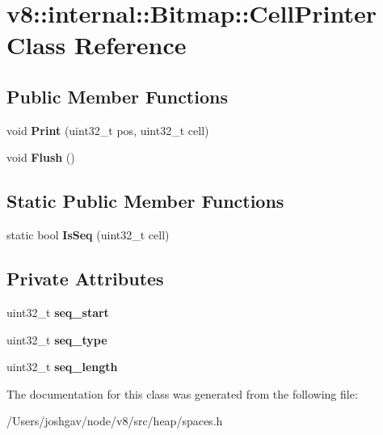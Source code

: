 \hypertarget{classv8_1_1internal_1_1_bitmap_1_1_cell_printer}{}\section{v8\+:\+:internal\+:\+:Bitmap\+:\+:Cell\+Printer Class Reference}
\label{classv8_1_1internal_1_1_bitmap_1_1_cell_printer}
\subsection*{Public Member Functions}
\begin{DoxyCompactItemize}
\item 
void {\bfseries Print} (uint32\+\_\+t pos, uint32\+\_\+t cell)\hypertarget{classv8_1_1internal_1_1_bitmap_1_1_cell_printer_aa62cfa9df2609d8bd5c8959c267fa91b}{}\label{classv8_1_1internal_1_1_bitmap_1_1_cell_printer_aa62cfa9df2609d8bd5c8959c267fa91b}

\item 
void {\bfseries Flush} ()\hypertarget{classv8_1_1internal_1_1_bitmap_1_1_cell_printer_a4a7caff1c02b90a3219d0f92a0ca2cb0}{}\label{classv8_1_1internal_1_1_bitmap_1_1_cell_printer_a4a7caff1c02b90a3219d0f92a0ca2cb0}

\end{DoxyCompactItemize}
\subsection*{Static Public Member Functions}
\begin{DoxyCompactItemize}
\item 
static bool {\bfseries Is\+Seq} (uint32\+\_\+t cell)\hypertarget{classv8_1_1internal_1_1_bitmap_1_1_cell_printer_abeada4db062f6d55f6e6dfa54f53f6a8}{}\label{classv8_1_1internal_1_1_bitmap_1_1_cell_printer_abeada4db062f6d55f6e6dfa54f53f6a8}

\end{DoxyCompactItemize}
\subsection*{Private Attributes}
\begin{DoxyCompactItemize}
\item 
uint32\+\_\+t {\bfseries seq\+\_\+start}\hypertarget{classv8_1_1internal_1_1_bitmap_1_1_cell_printer_a29b6c74a7add885a666f5b79fd1cbe6c}{}\label{classv8_1_1internal_1_1_bitmap_1_1_cell_printer_a29b6c74a7add885a666f5b79fd1cbe6c}

\item 
uint32\+\_\+t {\bfseries seq\+\_\+type}\hypertarget{classv8_1_1internal_1_1_bitmap_1_1_cell_printer_ad33864125580b746c9b92a0b513668e1}{}\label{classv8_1_1internal_1_1_bitmap_1_1_cell_printer_ad33864125580b746c9b92a0b513668e1}

\item 
uint32\+\_\+t {\bfseries seq\+\_\+length}\hypertarget{classv8_1_1internal_1_1_bitmap_1_1_cell_printer_a2778a390a7edfdfe7bac2cce0124c99d}{}\label{classv8_1_1internal_1_1_bitmap_1_1_cell_printer_a2778a390a7edfdfe7bac2cce0124c99d}

\end{DoxyCompactItemize}


The documentation for this class was generated from the following file\+:\begin{DoxyCompactItemize}
\item 
/\+Users/joshgav/node/v8/src/heap/spaces.\+h\end{DoxyCompactItemize}
